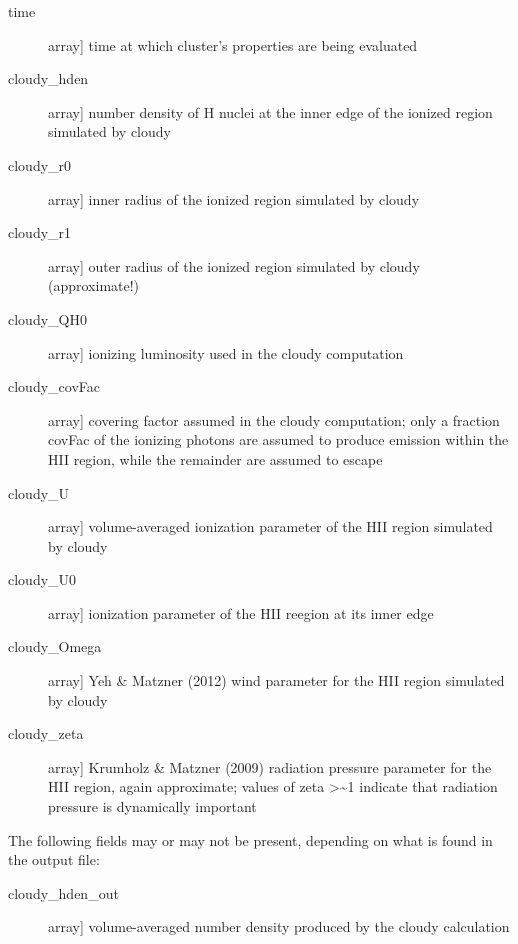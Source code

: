 \documentclass[letterpaper,10pt,english]{sphinxmanual}
\begin{document}
\begin{fulllineitems}
\begin{description}
\begin{description}
\item[{time}] \leavevmode{[}array{]}
time at which cluster’s properties are being evaluated

\item[{cloudy\_hden}] \leavevmode{[}array{]}
number density of H nuclei at the inner edge of the ionized
region simulated by cloudy

\item[{cloudy\_r0}] \leavevmode{[}array{]}
inner radius of the ionized region simulated by cloudy

\item[{cloudy\_r1}] \leavevmode{[}array{]}
outer radius of the ionized region simulated by cloudy (approximate!)

\item[{cloudy\_QH0}] \leavevmode{[}array{]}
ionizing luminosity used in the cloudy computation

\item[{cloudy\_covFac}] \leavevmode{[}array{]}
covering factor assumed in the cloudy computation; only a
fraction covFac of the ionizing photons are assumed to
produce emission within the HII region, while the remainder
are assumed to escape

\item[{cloudy\_U}] \leavevmode{[}array{]}
volume-averaged ionization parameter of the HII region
simulated by cloudy

\item[{cloudy\_U0}] \leavevmode{[}array{]}
ionization parameter of the HII reegion at its inner edge

\item[{cloudy\_Omega}] \leavevmode{[}array{]}
Yeh \& Matzner (2012) wind parameter for the HII region
simulated by cloudy

\item[{cloudy\_zeta}] \leavevmode{[}array{]}
Krumholz \& Matzner (2009) radiation pressure parameter for
the HII region, again approximate; values of zeta \textgreater{}\textasciitilde{}1
indicate that radiation pressure is dynamically important

\end{description}

The following fields may or may not be present, depending on
what is found in the output file:
\begin{description}
\item[{cloudy\_hden\_out}] \leavevmode{[}array{]}
volume-averaged number density produced by the cloudy
calculation


\end{description}
\end{description}
\end{fulllineitems}
\end{document}
